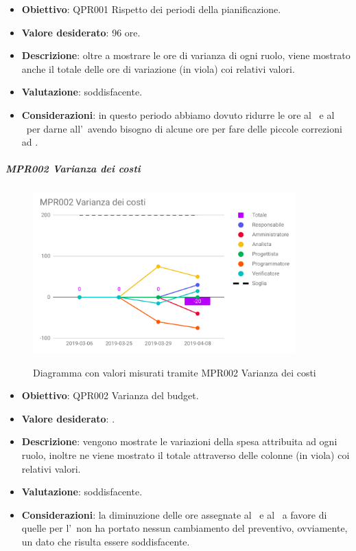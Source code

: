 	\begin{itemize}
		\item \textbf{Obiettivo}: QPR001 Rispetto dei periodi della pianificazione.
		\item \textbf{Valore desiderato}: 96 ore.
		\item \textbf{Descrizione}: oltre a mostrare le ore di varianza di ogni ruolo, viene mostrato anche il totale delle ore di variazione (in viola) coi relativi valori.
		\item \textbf{Valutazione}: soddisfacente.
		\item \textbf{Considerazioni}: in questo periodo abbiamo dovuto ridurre le ore al
		\Progr\ e al \Ver\ per darne all'\Ana\ avendo bisogno di alcune ore per fare delle piccole correzioni
		ad \AdRv.
	\end{itemize}

		\subparagraph{MPR002 Varianza dei costi}
	
	\begin{figure}[H]
		\centering
		\includegraphics[width=0.9\textwidth]{img/cruscotti/RQ/MPR002.png}
		\label{immagineVarianzaCostiRQ}
		\caption{Diagramma con valori misurati tramite MPR002 Varianza dei costi}
	\end{figure}
	
	\begin{itemize}
		\item \textbf{Obiettivo}: QPR002 Varianza del budget.
		\item \textbf{Valore desiderato}: .
		\item \textbf{Descrizione}: vengono mostrate le variazioni della spesa attribuita ad ogni ruolo, inoltre ne viene mostrato il totale attraverso delle colonne (in viola) coi relativi valori.
		\item \textbf{Valutazione}: soddisfacente.
		\item \textbf{Considerazioni}: la diminuzione delle ore assegnate al \Progr\ e al \Ver\ a favore di quelle per l'\Ana\, non ha portato nessun cambiamento del preventivo, ovviamente, un dato che
		risulta essere soddisfacente.
	\end{itemize}

